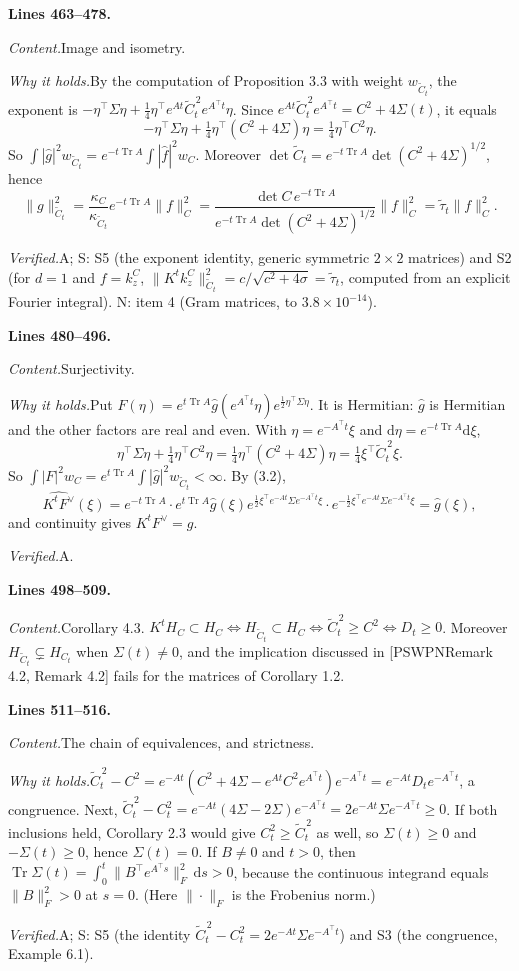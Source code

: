 \documentclass[11pt]{amsart}
\newcommand{\Tr}{\operatorname{Tr}}
\newcommand{\dd}{\,\mathrm{d}}
\newcommand{\Ct}{\widetilde{C}_t}
\newcommand{\taut}{\widetilde{\tau}_t}
\newcommand{\hatf}[1]{\widehat{#1}}
\newcommand{\tp}{\top}
\newcommand{\src}[1]{\par\bigskip\noindent\textbf{Lines #1.}\enspace}
\newcommand{\content}{\par\smallskip\noindent\textit{Content.}\enspace}
\newcommand{\why}{\par\smallskip\noindent\textit{Why it holds.}\enspace}
\newcommand{\verified}{\par\smallskip\noindent\textit{Verified.}\enspace}
\newcommand{\tA}{\textsf{A}}
\newcommand{\tS}{\textsf{S}}
\newcommand{\tN}{\textsf{N}}
\newcommand{\PS}[1][]{[PSWPN\ifx\relax#1\relax\else, #1\fi]}
\begin{document}
\src{463--478}
\content Image and isometry.
\why By the computation of Proposition 3.3 with weight $w_{\Ct}$, the exponent is
$-\eta^\tp\Sigma\eta+\frac14\eta^\tp e^{At}\Ct^{\,2}e^{A^\tp t}\eta$. Since
$e^{At}\Ct^{\,2}e^{A^\tp t}=C^2+4\Sigma(t)$, it equals
\[
-\eta^\tp\Sigma\eta+\tfrac14\eta^\tp(C^2+4\Sigma)\eta=\tfrac14\eta^\tp C^2\eta .
\]
So $\int|\hatf g|^2w_{\Ct}=e^{-t\Tr A}\int|\hatf f|^2w_C$. Moreover $\det\Ct=e^{-t\Tr A}\det(C^2+4\Sigma)^{1/2}$,
hence
\[
\|g\|_{\Ct}^2=\frac{\kappa_C}{\kappa_{\Ct}}e^{-t\Tr A}\|f\|_C^2
=\frac{\det C\,e^{-t\Tr A}}{e^{-t\Tr A}\det(C^2+4\Sigma)^{1/2}}\|f\|_C^2=\taut\|f\|_C^2 .
\]
\verified \tA; \tS: S5 (the exponent identity, generic symmetric $2\times2$ matrices) and S2 (for $d=1$ and $f=k^C_z$,
$\|K^tk^C_z\|_{\Ct}^2=c/\sqrt{c^2+4\sigma}=\taut$, computed from an explicit Fourier integral). \tN: item 4 (Gram
matrices, to $3.8\times10^{-14}$).

\src{480--496}
\content Surjectivity.
\why Put $F(\eta)=e^{t\Tr A}\hatf g(e^{A^\tp t}\eta)e^{\frac12\eta^\tp\Sigma\eta}$. It is Hermitian: $\hatf g$ is
Hermitian and the other factors are real and even. With $\eta=e^{-A^\tp t}\xi$ and $\mathrm d\eta=e^{-t\Tr A}\mathrm
d\xi$,
\[
\eta^\tp\Sigma\eta+\tfrac14\eta^\tp C^2\eta=\tfrac14\eta^\tp(C^2+4\Sigma)\eta=\tfrac14\xi^\tp\Ct^{\,2}\xi .
\]
So $\int|F|^2w_C=e^{t\Tr A}\int|\hatf g|^2w_{\Ct}<\infty$. By (3.2),
\[
\hatf{K^tF^\vee}(\xi)=e^{-t\Tr A}\cdot e^{t\Tr A}\hatf g(\xi)e^{\frac12\xi^\tp e^{-At}\Sigma e^{-A^\tp t}\xi}
\cdot e^{-\frac12\xi^\tp e^{-At}\Sigma e^{-A^\tp t}\xi}=\hatf g(\xi),
\]
and continuity gives $K^tF^\vee=g$.
\verified \tA.

\src{498--509}
\content Corollary 4.3. $K^tH_C\subset H_C\iff H_{\Ct}\subset H_C\iff\Ct^{\,2}\ge C^2\iff D_t\ge0$. Moreover
$H_{\Ct}\subsetneq H_{C_t}$ when $\Sigma(t)\ne0$, and the implication discussed in \PS[Remark 4.2] fails for the matrices
of Corollary 1.2.

\src{511--516}
\content The chain of equivalences, and strictness.
\why $\Ct^{\,2}-C^2=e^{-At}(C^2+4\Sigma-e^{At}C^2e^{A^\tp t})e^{-A^\tp t}=e^{-At}D_te^{-A^\tp t}$, a congruence.
Next, $\Ct^{\,2}-C_t^2=e^{-At}(4\Sigma-2\Sigma)e^{-A^\tp t}=2e^{-At}\Sigma e^{-A^\tp t}\ge0$. If both inclusions held,
Corollary 2.3 would give $C_t^2\ge\Ct^{\,2}$ as well, so $\Sigma(t)\ge0$ and $-\Sigma(t)\ge0$, hence $\Sigma(t)=0$.
If $B\ne0$ and $t>0$, then $\Tr\Sigma(t)=\int_0^t\|B^\tp e^{A^\tp s}\|_F^2\dd s>0$, because the continuous integrand
equals $\|B\|_F^2>0$ at $s=0$. (Here $\|\cdot\|_F$ is the Frobenius norm.)
\verified \tA; \tS: S5 (the identity $\Ct^{\,2}-C_t^2=2e^{-At}\Sigma e^{-A^\tp t}$) and S3 (the congruence, Example
6.1).
\end{document}
